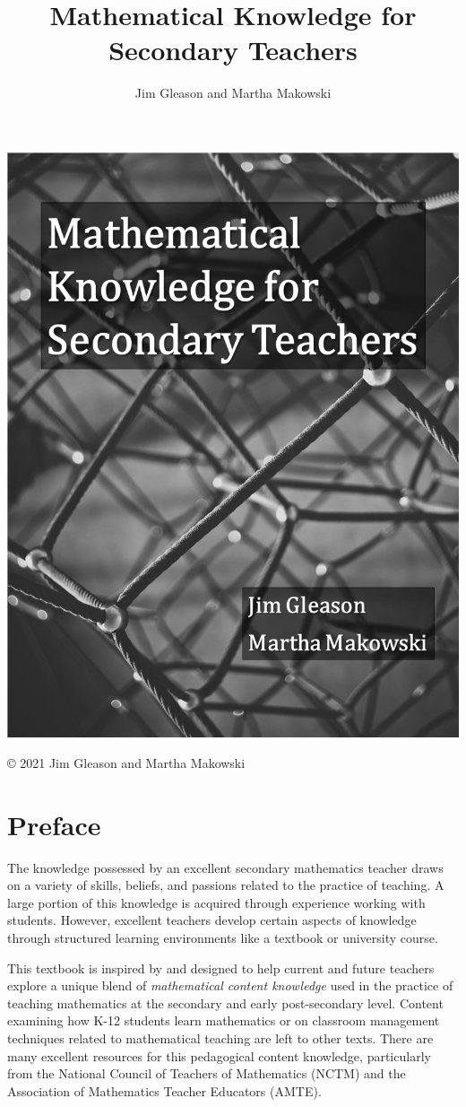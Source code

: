 \documentclass[
]{book}
\title{Mathematical Knowledge for Secondary Teachers}
\author{Jim Gleason and Martha Makowski}
\date{}
\theoremstyle{definition}
\theoremstyle{definition}
\theoremstyle{definition}
\theoremstyle{definition}
\theoremstyle{remark}
\begin{document}
\maketitle

{
\setcounter{tocdepth}{1}
\tableofcontents
}
\hypertarget{section}{%
\chapter*{}\label{section}}

\begin{center}\includegraphics[width=0.5\linewidth]{images/Cover} \end{center}

© 2021 Jim Gleason and Martha Makowski

\hypertarget{preface}{%
\chapter*{Preface}\label{preface}}

The knowledge possessed by an excellent secondary mathematics teacher draws on a variety of skills, beliefs, and passions related to the practice of teaching. A large portion of this knowledge is acquired through experience working with students. However, excellent teachers develop certain aspects of knowledge through structured learning environments like a textbook or university course.

This textbook is inspired by \citet{Usiskin2003} and designed to help current and future teachers explore a unique blend of \emph{mathematical content knowledge} used in the practice of teaching mathematics at the secondary and early post-secondary level. Content examining how K-12 students learn mathematics or on classroom management techniques related to mathematical teaching are left to other texts. There are many excellent resources for this pedagogical content knowledge, particularly from the National Council of Teachers of Mathematics (NCTM) and the Association of Mathematics Teacher Educators (AMTE).
\end{document}
